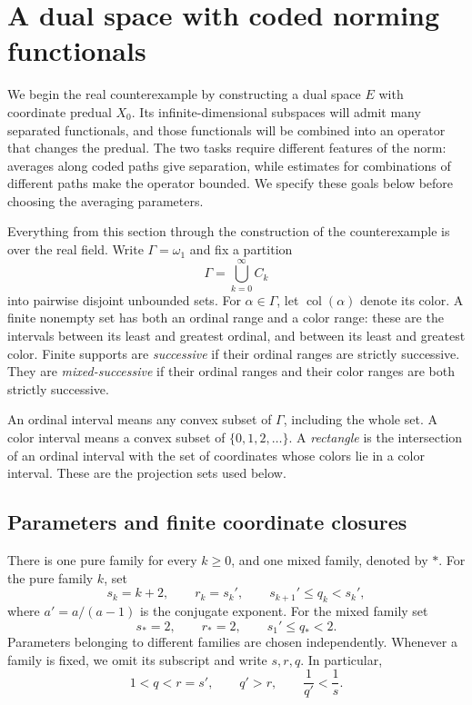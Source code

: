 \section{A dual space with coded norming functionals}
\label{sec:norming}

We begin the real counterexample by constructing a dual space $E$ with
coordinate predual $X_0$. Its infinite-dimensional subspaces will admit
many separated functionals, and those functionals will be combined into
an operator that changes the predual. The two tasks require different
features of the norm: averages along coded paths give separation, while
estimates for combinations of different paths make the operator bounded.
We specify these goals below before choosing the averaging parameters.

Everything from this section through the construction of the counterexample
is over the real field.  Write $\Gamma=\omega_1$ and fix a partition
\[
 \Gamma=\bigcup_{k=0}^{\infty} C_k
\]
into pairwise disjoint unbounded sets.  For $\alpha\in\Gamma$, let
$\operatorname{col}(\alpha)$ denote its color.  A finite nonempty set has
both an ordinal range and a color range: these are the intervals between
its least and greatest ordinal, and between its least and greatest color.
Finite supports are \emph{successive} if their ordinal ranges are strictly
successive.  They are \emph{mixed-successive} if their ordinal ranges and
their color ranges are both strictly successive.

An ordinal interval means any convex subset of $\Gamma$, including the
whole set.  A color interval means a convex subset of
$\{0,1,2,\ldots\}$.  A \emph{rectangle} is the intersection of an ordinal
interval with the set of coordinates whose colors lie in a color
interval.  These are the projection sets used below.

\subsection{Parameters and finite coordinate closures}

There is one pure family for every $k\ge0$, and one mixed family, denoted
by $*$.  For the pure family $k$, set
\[
 s_k=k+2,\qquad r_k=s_k',\qquad s_{k+1}'\le q_k<s_k',
\]
where $a'=a/(a-1)$ is the conjugate exponent.  For the mixed family set
\[
 s_*=2,\qquad r_*=2,\qquad s_1'\le q_*<2.
\]
Parameters belonging to different families are chosen independently.
Whenever a family is fixed, we omit its subscript and write $s,r,q$.
In particular,
\[
 1<q<r=s',\qquad q'>r,\qquad \frac1{q'}<\frac1s.
\]

